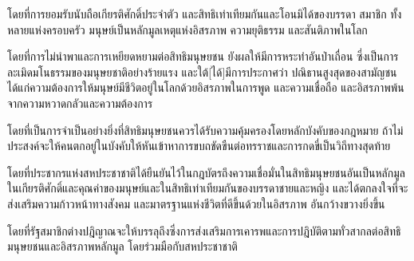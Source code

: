 โดย{\wbr}ที่{\wbr}การ{\wbr}ยอม\-รับ{\wbr}นับ\-ถือ{\wbr}เกียรติ\-ศักดิ์{\wbr}ประ\-จำ{\wbr}ตัว และ{\wbr}สิทธิ{\wbr}เท่า\-เทียม{\wbr}กัน{\wbr}และ{\wbr}โอน{\wbr}มิ{\wbr}ได้{\wbr}ของ{\wbr}บรร\-ดา สมา\-ชิก ทั้ง หลาย{\wbr}แห่ง{\wbr}ครอบ\-ครัว มนุษย์{\wbr}เป็น{\wbr}หลัก{\wbr}มูล\-เหตุ{\wbr}แห่ง{\wbr}อิสร\-ภาพ ความ{\wbr}ยุติ\-ธรรม และ{\wbr}สัน\-ติ\-ภาพ{\wbr}ใน{\wbr}โลก

โดย{\wbr}ที่{\wbr}การ{\wbr}ไม่{\wbr}นำ\-พา{\wbr}และ{\wbr}การ{\wbr}เหยียด\-หยาม{\wbr}ต่อ{\wbr}สิทธิ{\wbr}มนุษย{\wbr}ชน ยัง{\wbr}ผล{\wbr}ให้{\wbr}มี{\wbr}การ{\wbr}หระ{\wbr}ทำ{\wbr}อัน{\wbr}ป่า\-เถื่อน ซี่{\wbr}ง{\wbr}เป็น{\wbr}การ{\wbr}ละ\-เมิด{\wbr}มโน\-ธรรม{\wbr}ของ{\wbr}มนุษย\-ชาติ{\wbr}อย่าง{\wbr}ร้าย\-แรง และ{\wbr}ใต้[ได้]มี{\wbr}การ{\wbr}ประ\-กาศ{\wbr}ว่า ปณิ\-ธาน{\wbr}สูง{\wbr}สุด{\wbr}ของ{\wbr}สา\-มัญ\-ชน{\wbr}ได้\-แก่{\wbr}ความ{\wbr}ต้อง\-การ{\wbr}ให้{\wbr}มนุษย์{\wbr}มี{\wbr}ชี\-วิต{\wbr}อยู่{\wbr}ใน{\wbr}โลก{\wbr}ด้วย{\wbr}อิสร\-ภาพ{\wbr}ใน{\wbr}การ{\wbr}พูด และ{\wbr}ความ{\wbr}เชื่อ\-ถือ และ{\wbr}อิสร\-ภาพ{\wbr}พ้น{\wbr}จาก{\wbr}ความ{\wbr}หวาด\-กลัว{\wbr}และ{\wbr}ความ{\wbr}ต้อง\-การ

โดย{\wbr}ที่{\wbr}เป็น{\wbr}การ{\wbr}จำ\-เป็น{\wbr}อย่าง{\wbr}ยิ่ง{\wbr}ที่{\wbr}สิทธิ{\wbr}มนุษย{\wbr}ชน{\wbr}ควร{\wbr}ได้{\wbr}รับ{\wbr}ความ{\wbr}คุ้ม\-ครอง{\wbr}โดย{\wbr}หลัก{\wbr}บัง\-คับ{\wbr}ของ{\wbr}กฎ\-หมาย ถ้า{\wbr}ไม่{\wbr}ประ\-สงค์{\wbr}จะ{\wbr}ให้{\wbr}คน{\wbr}ตก{\wbr}อยู่{\wbr}ใน{\wbr}บัง\-คับ{\wbr}ให้{\wbr}หัน{\wbr}เข้า{\wbr}หา{\wbr}การ{\wbr}ขบถ{\wbr}ขัด\-ขืน{\wbr}ต่อ{\wbr}ทร\-ราช{\wbr}และ{\wbr}การ{\wbr}กด\-ขี่{\wbr}เป็น{\wbr}วิ\-ถี\-ทาง{\wbr}สุด\-ท้าย

โดย{\wbr}ที่{\wbr}ประ\-ชา\-กร{\wbr}แห่ง{\wbr}สห\-ประ\-ชา\-ชาติ{\wbr}ได้{\wbr}ยืน\-ยัน{\wbr}ไว้{\wbr}ใน{\wbr}กฎ\-บัตร{\wbr}ถึง{\wbr}ความ{\wbr}เชื่อ{\wbr}มั่น{\wbr}ใน{\wbr}สิทธิ{\wbr}มนุษย{\wbr}ชน{\wbr}อัน{\wbr}เป็น{\wbr}หลัก{\wbr}มูล ใน{\wbr}เกียรติ\-ศักดิ์{\wbr}และ{\wbr}คุณ\-ค่า{\wbr}ของ{\wbr}มนุษย์{\wbr}และ{\wbr}ใน{\wbr}สิทธิ{\wbr}เท่า\-เทียม{\wbr}กัน{\wbr}ของ{\wbr}บรร\-ดา{\wbr}ชาย{\wbr}และ{\wbr}หญิง และ{\wbr}ได้{\wbr}ตก\-ลง{\wbr}ใจ{\wbr}ที่{\wbr}จะ{\wbr}ส่ง\-เสริม{\wbr}ความ{\wbr}ก้าว\-หน้า{\wbr}ทาง{\wbr}สัง\-คม และ{\wbr}มาตร\-ฐาน{\wbr}แห่ง{\wbr}ชี\-วิต{\wbr}ที่{\wbr}ดี{\wbr}ขึ้น{\wbr}ด้วย{\wbr}ใน{\wbr}อิสร\-ภาพ อัน{\wbr}กว้าง{\wbr}ขวาง{\wbr}ยิ่ง{\wbr}ขึ้น

โดย{\wbr}ที่{\wbr}รัฐ{\wbr}สมา\-ชิก{\wbr}ต่าง{\wbr}ปฎิ{\wbr}ญาณ{\wbr}จะ{\wbr}ให้{\wbr}บรร\-ลุ{\wbr}ถึง{\wbr}ซึ่ง{\wbr}การ{\wbr}ส่ง\-เสริม{\wbr}การ{\wbr}เคา\-รพ{\wbr}และ{\wbr}การ{\wbr}ปฎิ\-บั{\wbr}ติ{\wbr}ตาม{\wbr}ทั่ว{\wbr}สา\-กล{\wbr}ต่อ{\wbr}สิทธิ{\wbr}มนุษย{\wbr}ชน{\wbr}และ{\wbr}อิสร\-ภาพ{\wbr}หลัก{\wbr}มูล โดย{\wbr}ร่วม\-มือ{\wbr}กับ{\wbr}สห\-ประ\-ชา\-ชาติ

